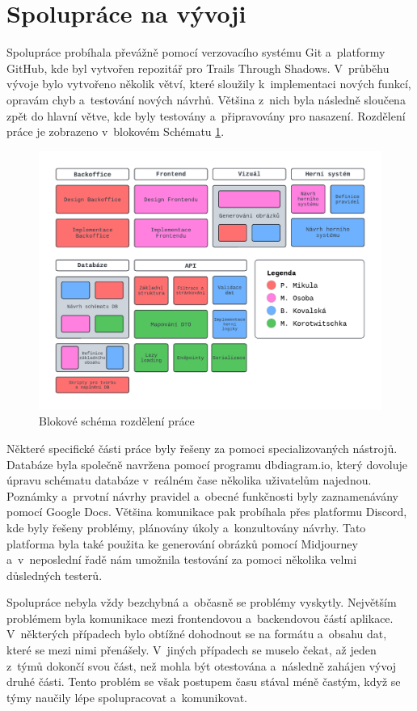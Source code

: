 \section{Spolupráce na vývoji}
Spolupráce probíhala převážně pomocí verzovacího systému Git a~platformy GitHub, kde byl vytvořen repozitář pro Trails Through Shadows. V~průběhu vývoje bylo vytvořeno několik větví, které sloužily k~implementaci nových funkcí, opravám chyb a~testování nových návrhů. Většina z~nich byla následně sloučena zpět do hlavní větve, kde byly testovány a~připravovány pro nasazení. Rozdělení práce je zobrazeno v~blokovém Schématu \ref{fig:workflow}.

\begin{figure}[h]
  \centering
  \includegraphics[width=\textwidth]{../../shared/diagrams/blocks.pdf}
  \caption{Blokové schéma rozdělení práce}
  \label{fig:workflow}
\end{figure}

Některé specifické části práce byly řešeny za pomoci specializovaných nástrojů. Databáze byla společně navržena pomocí programu dbdiagram.io, který dovoluje úpravu schématu databáze v~reálném čase několika uživatelům najednou. Poznámky a~prvotní návrhy pravidel a~obecné funkčnosti byly zaznamenávány pomocí Google Docs. Většina komunikace pak probíhala přes platformu Discord, kde byly řešeny problémy, plánovány úkoly a~konzultovány návrhy. Tato platforma byla také použita ke generování obrázků pomocí Midjourney a~v~neposlední řadě nám umožnila testování za pomoci několika velmi důsledných testerů.

Spolupráce nebyla vždy bezchybná a~občasně se problémy vyskytly. Největším problémem byla komunikace mezi frontendovou a~backendovou částí aplikace. V~některých případech bylo obtížné dohodnout se na formátu a~obsahu dat, které se mezi nimi přenášely. V~jiných případech se muselo čekat, až jeden z~týmů dokončí svou část, než mohla být otestována a~následně zahájen vývoj druhé části. Tento problém se však postupem času stával méně častým, když se týmy naučily lépe spolupracovat a~komunikovat.